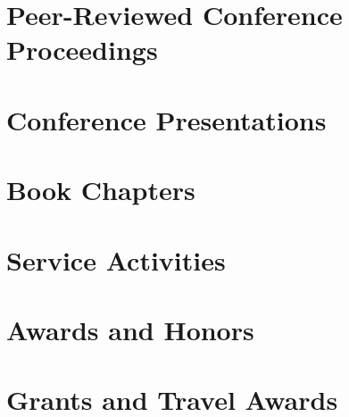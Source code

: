 \documentclass[letterpaper,11pt]{article}
\begin{document}
\section{Peer-Reviewed Conference Proceedings}



\section{Conference Presentations}






\section{Book Chapters}

\vspace{-52pt}


\nocite{*}


\section{Service Activities}


\section{Awards and Honors}


\section{Grants and Travel Awards}


\end{document}
